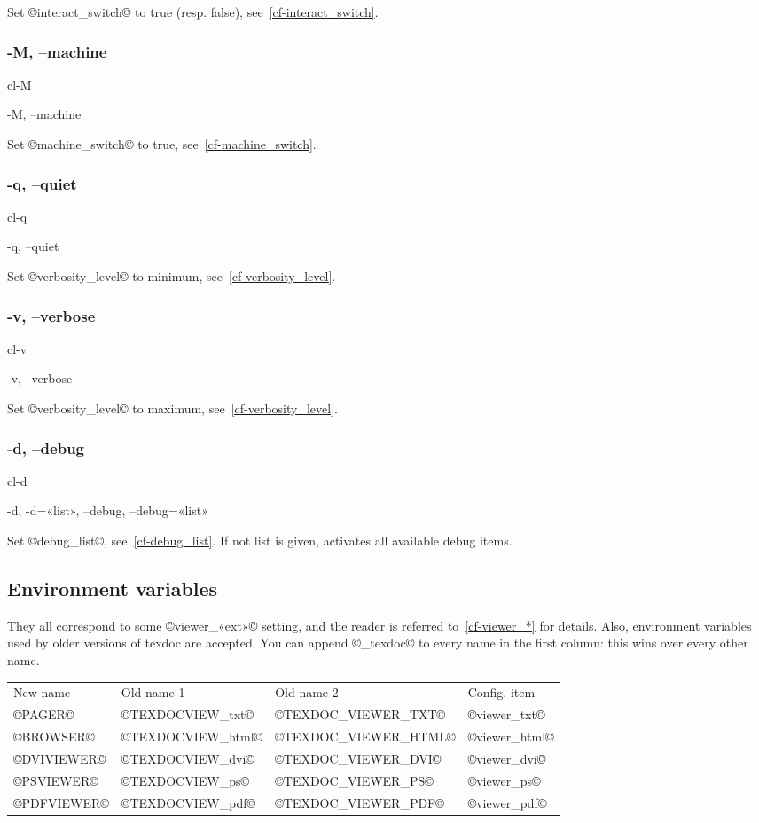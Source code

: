 \documentclass[a4paper, oneside]{scrartcl}
\newif\ifframed
\newenvironment{cmdsubsub}[2]{%
  \framedfalse \commandes\subsubsection{#1}{#2}%
  }{%
  \endcommandes}
\newcommand\texdoc{texdoc\xspace}
\begin{document}
Set ©interact_switch© to true (resp. false), see~\ref{cf-interact_switch}.

\begin{cmdsubsub}{-M, --machine}{cl-M}
  -M, --machine
\end{cmdsubsub}

Set ©machine_switch© to true, see~\ref{cf-machine_switch}.

\begin{cmdsubsub}{-q, --quiet}{cl-q}
  -q, --quiet
\end{cmdsubsub}

Set ©verbosity_level© to minimum, see~\ref{cf-verbosity_level}.

\begin{cmdsubsub}{-v, --verbose}{cl-v}
  -v, --verbose
\end{cmdsubsub}

Set ©verbosity_level© to maximum, see~\ref{cf-verbosity_level}.

\begin{cmdsubsub}{-d, --debug}{cl-d}
  -d, -d=«list», --debug, --debug=«list»
\end{cmdsubsub}

Set ©debug_list©, see~\ref{cf-debug_list}. If not list is given, activates all
available debug items.

\subsection{Environment variables}\label{ss-envvar}

They all correspond to some ©viewer_«ext»© setting, and the reader is referred
to~\ref{cf-viewer_*} for details. Also, environment variables used by older
versions of \texdoc are accepted. You can append ©_texdoc© to every name in
the first column: this wins over every other name.

\begin{center}
  \begin{tabular}{*4l}
    New name    & Old name 1        & Old name 2           & Config. item\\
    ©PAGER©     & ©TEXDOCVIEW_txt©  & ©TEXDOC_VIEWER_TXT©  & ©viewer_txt©  \\
    ©BROWSER©   & ©TEXDOCVIEW_html© & ©TEXDOC_VIEWER_HTML© & ©viewer_html© \\
    ©DVIVIEWER© & ©TEXDOCVIEW_dvi©  & ©TEXDOC_VIEWER_DVI©  & ©viewer_dvi©  \\
    ©PSVIEWER©  & ©TEXDOCVIEW_ps©   & ©TEXDOC_VIEWER_PS©   & ©viewer_ps©   \\
    ©PDFVIEWER© & ©TEXDOCVIEW_pdf©  & ©TEXDOC_VIEWER_PDF©  & ©viewer_pdf©  \\
  \end{tabular}
\end{center}
\end{document}
